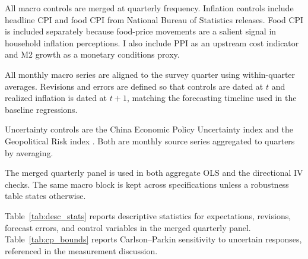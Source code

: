All macro controls are merged at quarterly frequency.
Inflation controls include headline CPI and food CPI from
National Bureau of Statistics releases. Food CPI is included
separately because food-price movements are a salient signal
in household inflation perceptions. I also include PPI as an
upstream cost indicator and M2 growth as a monetary
conditions proxy.

All monthly macro series are aligned to the survey quarter
using within-quarter averages. Revisions and errors are
defined so that controls are dated at $t$ and realized
inflation is dated at $t+1$, matching the forecasting
timeline used in the baseline regressions.

Uncertainty controls are the China Economic Policy
Uncertainty index \citep{Baker2016} and the Geopolitical
Risk index \citep{Caldara2022}. Both are monthly source
series aggregated to quarters by averaging.

The merged quarterly panel is used in both aggregate OLS and
the directional IV checks. The same macro block is kept
across specifications unless a robustness table states
otherwise.

Table~\ref{tab:desc_stats} reports descriptive statistics
for expectations, revisions, forecast errors, and control
variables in the merged quarterly panel.
Table~\ref{tab:cp_bounds} reports Carlson--Parkin sensitivity
to uncertain responses, referenced in the measurement
discussion.



